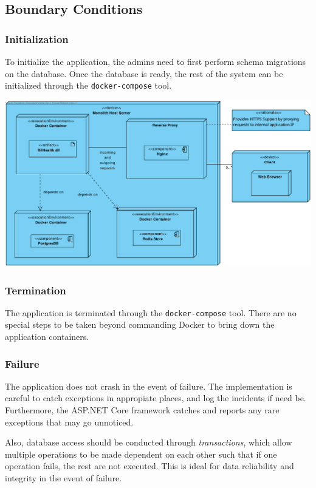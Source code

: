 \documentclass[a4paper, 12pt, titlepage]{article}
\begin{document}
  \subsection{Boundary Conditions}

  \subsubsection{Initialization}

  To initialize the application, the admins need to first perform schema migrations on the database.
  Once the database is ready, the rest of the system can be initialized through the \texttt{docker-compose} tool.

  \includegraphics[width=\linewidth]{deploy_diag.pdf}

  \subsubsection{Termination}

  The application is terminated through the \texttt{docker-compose} tool.
  There are no special steps to be taken beyond commanding Docker to bring down the application containers.

  \subsubsection{Failure}

  The application does not crash in the event of failure.
  The implementation is careful to catch exceptions in appropiate places, and log the incidents if need be.
  Furthermore, the ASP.NET Core framework catches and reports any rare exceptions that may go unnoticed.

  Also, database access should be conducted through \textit{transactions}, which allow multiple operations to
  be made dependent on each other such that if one operation fails, the rest are not executed.
  This is ideal for data reliability and integrity in the event of failure.
\end{document}
